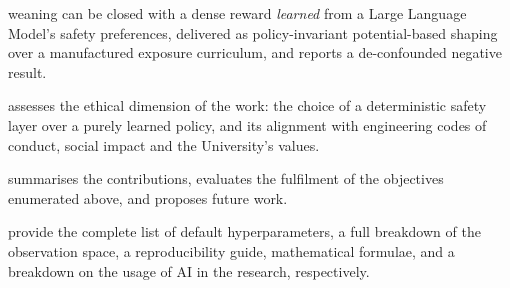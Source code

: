 \begin{description}
        weaning can be closed with a dense reward \emph{learned} from a Large Language Model's
        safety preferences, delivered as policy-invariant potential-based shaping over a
        manufactured exposure curriculum, and reports a de-confounded negative result.
  \item[Chapter~\ref{sec:ethics}] assesses the ethical dimension of the work: the choice of a
        deterministic safety layer over a purely learned policy, and its alignment with
        engineering codes of conduct, social impact and the University's values.
  \item[Chapter~\ref{ch:conclusions}] summarises the contributions, evaluates the fulfilment of
        the objectives enumerated above, and proposes future work.
  \item[Appendices~\ref{app:hyperparameters}, \ref{app:observation}, \ref{app:reproducibility}, \ref{app:math} and \ref{app:ai-usage}]
        provide the complete list of default hyperparameters, a full breakdown of the observation
        space, a reproducibility guide, mathematical formulae, and a breakdown on the usage of AI in the research, respectively.
\end{description}
